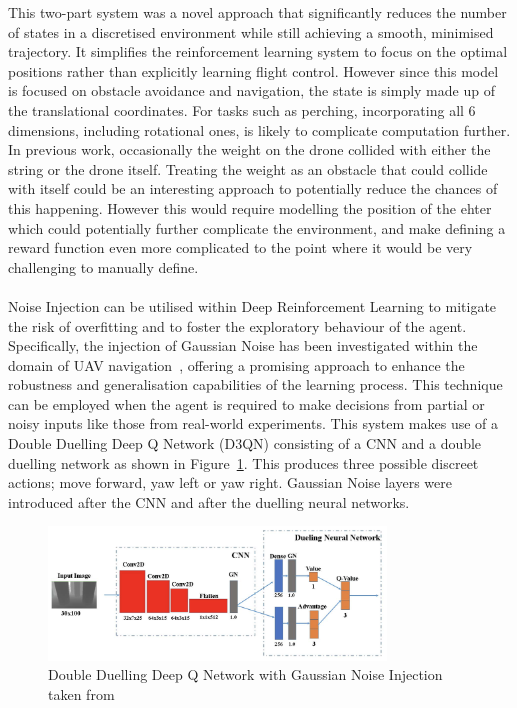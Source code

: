 This two-part system was a novel approach that significantly reduces the number of states in a discretised environment while still achieving a smooth, minimised trajectory.
It simplifies the reinforcement learning system to focus on the optimal positions rather than explicitly learning flight control.
However since this model is focused on obstacle avoidance and navigation, the state is simply made up of the translational coordinates.
For tasks such as perching, incorporating all 6 dimensions, including rotational ones, is likely to complicate computation further.
In previous work, occasionally the weight on the drone collided with either the string or the drone itself.
Treating the weight as an obstacle that could collide with itself could be an interesting approach to potentially reduce the chances of this happening.
However this would require modelling the position of the ehter which could potentially further complicate the environment, and make defining a reward function even more complicated to the point where it would be very challenging to manually define. \\\\

Noise Injection can be utilised within Deep Reinforcement Learning to mitigate the risk of overfitting and to foster the exploratory behaviour of the agent.
Specifically, the injection of Gaussian Noise has been investigated within the domain of UAV navigation~\cite{fyp13-noise-injection}, offering a promising approach to enhance the robustness and generalisation capabilities of the learning process.
This technique can be employed when the agent is required to make decisions from partial or noisy inputs like those from real-world experiments.
This system makes use of a Double Duelling Deep Q Network (D3QN) consisting of a CNN and a double duelling network as shown in Figure~\ref{fig:fyp13-d3qn-noise}.
This produces three possible discreet actions; move forward, yaw left or yaw right.
Gaussian Noise layers were introduced after the CNN and after the duelling neural networks.

\begin{figure}[htbp]
  \centering
  \includegraphics[width=0.8\textwidth]{background/fyp13-noise-injection.png}
  \caption{Double Duelling Deep Q Network with Gaussian Noise Injection taken from~\cite{fyp13-noise-injection}}
\label{fig:fyp13-d3qn-noise}
\end{figure}

